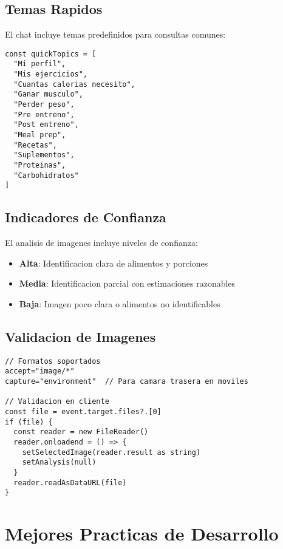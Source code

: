 \documentclass[12pt,a4paper]{article}
\begin{document}
\subsection{Temas Rapidos}

El chat incluye temas predefinidos para consultas comunes:

\begin{lstlisting}[caption=Temas rapidos del chat]
const quickTopics = [
  "Mi perfil",
  "Mis ejercicios", 
  "Cuantas calorias necesito",
  "Ganar musculo",
  "Perder peso",
  "Pre entreno",
  "Post entreno",
  "Meal prep",
  "Recetas",
  "Suplementos",
  "Proteinas",
  "Carbohidratos"
]
\end{lstlisting}

\subsection{Indicadores de Confianza}

El analisis de imagenes incluye niveles de confianza:

\begin{itemize}
    \item \textbf{Alta}: Identificacion clara de alimentos y porciones
    \item \textbf{Media}: Identificacion parcial con estimaciones razonables
    \item \textbf{Baja}: Imagen poco clara o alimentos no identificables
\end{itemize}

\subsection{Validacion de Imagenes}

\begin{lstlisting}[caption=Validacion de tipos de archivo]
// Formatos soportados
accept="image/*"
capture="environment"  // Para camara trasera en moviles

// Validacion en cliente
const file = event.target.files?.[0]
if (file) {
  const reader = new FileReader()
  reader.onloadend = () => {
    setSelectedImage(reader.result as string)
    setAnalysis(null)
  }
  reader.readAsDataURL(file)
}
\end{lstlisting}

\section{Mejores Practicas de Desarrollo}
\end{document}

